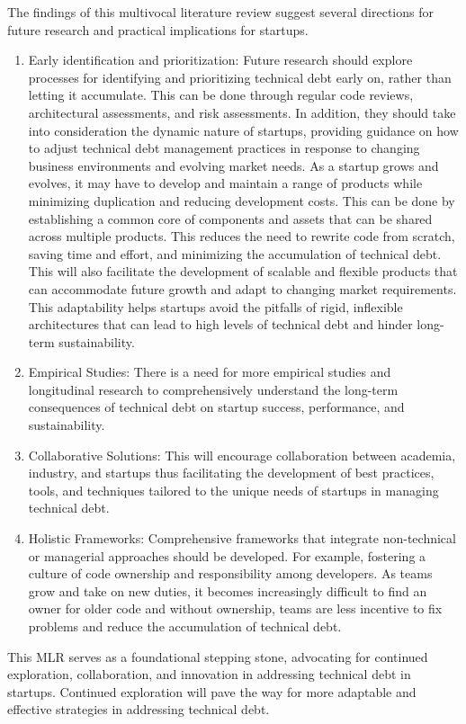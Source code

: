 The findings of this multivocal literature review suggest several directions for future research and practical implications for startups.
\begin{enumerate}
    \item Early identification and prioritization: Future research should explore processes for identifying and prioritizing technical debt early on, rather than letting it accumulate. This can be done through regular code reviews, architectural assessments, and risk assessments. In addition, they should take into consideration the dynamic nature of startups, providing guidance on how to adjust technical debt management practices in response to changing business environments and evolving market needs. As a startup grows and evolves, it may have to develop and maintain a range of products while minimizing duplication and reducing development costs. This can be done by establishing a common core of components and assets that can be shared across multiple products. This reduces the need to rewrite code from scratch, saving time and effort, and minimizing the accumulation of technical debt. This will also facilitate the development of scalable and flexible products that can accommodate future growth and adapt to changing market requirements. This adaptability helps startups avoid the pitfalls of rigid, inflexible architectures that can lead to high levels of technical debt and hinder long-term sustainability.
    \item Empirical Studies: There is a need for more empirical studies and longitudinal research to comprehensively understand the long-term consequences of technical debt on startup success, performance, and sustainability.
    \item Collaborative Solutions: This will encourage collaboration between academia, industry, and startups thus facilitating the development of best practices, tools, and techniques tailored to the unique needs of startups in managing technical debt.
    \item Holistic Frameworks: Comprehensive frameworks that integrate non-technical or managerial approaches should be developed. For example, fostering a culture of code ownership and responsibility among developers. As teams grow and take on new duties, it becomes increasingly difficult to find an owner for older code and without ownership, teams are less incentive to fix problems and reduce the accumulation of technical debt.
\end{enumerate}

This MLR serves as a foundational stepping stone, advocating for continued exploration, collaboration, and innovation in addressing technical debt in startups.
Continued exploration will pave the way for more adaptable and effective strategies in addressing technical debt.